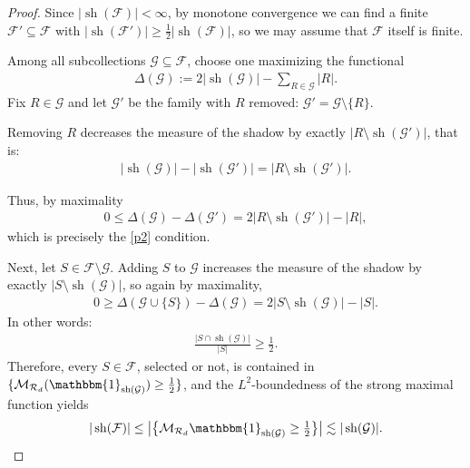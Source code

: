 \documentclass[oneside]{amsart}
\theoremstyle{definition}
\theoremstyle{plain}
\numberwithin{equation}{section}
\numberwithin{theorem}{section}
\newcommand{\sh}{\operatorname{sh}}
\newcommand{\ind}{\mathbbm{1}}
\begin{document}
\begin{proof}
  Since $|\sh(\mathcal{F})| < \infty$, by monotone convergence we can find
  a finite $\mathcal{F}' \subseteq \mathcal{F}$ with
  $|\sh(\mathcal{F}')| \geq \frac{1}{2}|\sh(\mathcal{F})|$, so we may assume
  that $\mathcal{F}$ itself is finite.

  Among all subcollections $\mathcal{G} \subseteq \mathcal{F}$, choose one
  maximizing the functional
  \begin{align*}
    \Delta(\mathcal{G}) := 2|\sh(\mathcal{G})| - \sum_{R \in \mathcal{G}} |R|.
  \end{align*}
  Fix $R \in \mathcal{G}$ and let $\mathcal{G}'$ be the family with $R$
  removed: $\mathcal{G}' = \mathcal{G} \setminus \{R\}$.

  Removing $R$ decreases the measure of the shadow by exactly
  $|R \setminus \sh(\mathcal{G}')|$, that is:
  \begin{align*}
    |\sh(\mathcal{G})| - |\sh(\mathcal{G}')| = |R \setminus \sh(\mathcal{G}')|.
  \end{align*}

  Thus, by maximality
  \begin{align*}
    0 \leq \Delta(\mathcal{G}) - \Delta(\mathcal{G}')
    = 2|R \setminus \sh(\mathcal{G}')| - |R|,
  \end{align*}
  which is precisely the \eqref{p2} condition.

  Next, let $S \in \mathcal{F} \setminus \mathcal{G}$.
  Adding $S$ to $\mathcal{G}$ increases the measure of the shadow by exactly
  $|S \setminus \sh(\mathcal{G})|$, so again by maximality,
  \begin{align*}
    0 \geq \Delta(\mathcal{G} \cup \{S\}) - \Delta(\mathcal{G})
    = 2|S \setminus \sh(\mathcal{G})| - |S|.
  \end{align*}
  In other words:
  \begin{align*}
    \frac{|S \cap \sh(\mathcal{G})|}{|S|} \geq \frac{1}{2}.
  \end{align*}
  Therefore, every $S \in \mathcal{F}$, selected or not, is contained in
  $\{\mathcal{M}_{\mathcal{R}_d} (\ind_{\sh(\mathcal{G})}) \geq \frac{1}{2}\}$,
  and the $L^2$-boundedness of the strong maximal function yields
  \begin{align*}
    |\sh(\mathcal{F})| \leq
    \big|\big\{\mathcal{M}_{\mathcal{R}_d} \ind_{\sh(\mathcal{G})} \geq
      \tfrac{1}{2}\big\}\big|
    \lesssim |\sh(\mathcal{G})|.
  \end{align*}
\end{proof}
\end{document}
